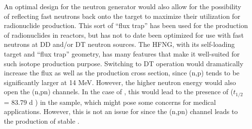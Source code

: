 \documentclass[5p]{elsarticle}
\newcommand{\pp}[1]{\left( #1\right)}
\newcommand{\textred}[1]{\textcolor{red}{ #1}}
\newcommand{\redactedit}[1]{\textcolor{blue}{ \sout{#1}}}
\begin{document}
 
% 
% 
% 
% 
% 
% 
% 



An optimal design for the neutron generator would also allow for the possibility of reflecting fast neutrons back onto the target to maximize their utilization for radionuclide production.
 This sort of \enquote{flux trap} has been used for the production of radionuclides in reactors, but has not to date been optimized for use with fast neutrons  at DD and/or DT neutron sources.
 The HFNG, with its self-loading target and \enquote{flux trap} geometry, has many features that make it well-suited for such isotope production purpose.
 Switching to DT operation would dramatically increase the flux as well as the production cross section, since (n,p) tends to be significantly larger at 14 MeV.
 However, the higher neutron energy would also open the (n,pn) channels.
 In the case of , this would lead to the presence of  ($t_{1/2}$ = 83.79 d \cite{Wu2000}) in the sample, which might pose some concerns for medical applications.
 However, this is not an issue for  since the (n,pn) channel leads to the production of stable .
 
\end{document}

